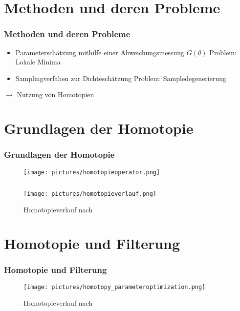 \documentclass[18pt]{beamer}
\begin{document}
\section{Methoden und deren Probleme}

\begin{frame}
    \frametitle{Methoden und deren Probleme}
    \begin{itemize}
        \item Parameterschätzung mithilfe einer Abweichungsmessung $G(\underline{\theta})$
        \newline
        Problem: Lokale Minima
        \newline
        \item Samplingverfahen zur Dichteschätzung
        \newline
        Problem: Sampledegenerierung
    \end{itemize}
    \vspace*{\baselineskip}
    \vspace*{\baselineskip}
    \centering 
    $\rightarrow$ Nutzung von Homotopien
\end{frame}

\section{Grundlagen der Homotopie}
\begin{frame}
    \frametitle{Grundlagen der Homotopie}
    \begin{figure}[c]
        \centering
        \texttt{[image: pictures/homotopieoperator.png]}
    \end{figure}
    \begin{figure}
        \begin{columns}
          \texttt{[image: pictures/homotopieverlauf.png]}
          \caption{Homotopieverlauf nach \cite{liao2012}}
        \end{columns}
      \end{figure}
\end{frame}

\section{Homotopie und Filterung}
\begin{frame}
    \frametitle{Homotopie und Filterung}
    \begin{figure}
        \centering
        \texttt{[image: pictures/homotopy\_parameteroptimization.png]}
        \caption{Homotopieverlauf nach \cite{hagmar2011}}
    \end{figure}
\end{frame}
\end{document}
